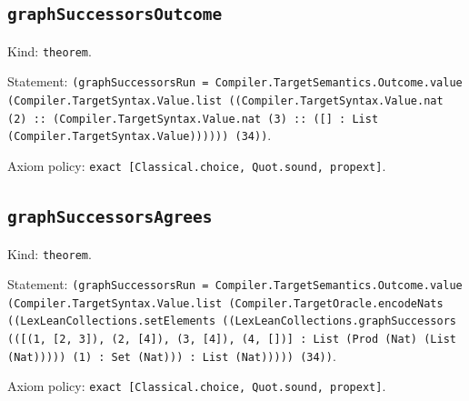 \documentclass[11pt]{article}
\begin{document}
\subsection*{\texttt{graphSuccessorsOutcome}}
\noindent Kind: \texttt{theorem}.\par
\noindent Statement: \texttt{(graphSuccessorsRun = Compiler.TargetSemantics.Outcome.value (Compiler.TargetSyntax.Value.list ((Compiler.TargetSyntax.Value.nat (2) :: (Compiler.TargetSyntax.Value.nat (3) :: ([] : List (Compiler.TargetSyntax.Value)))))) (34))}.\par
\noindent Axiom policy: \texttt{exact [Classical.choice, Quot.sound, propext]}.\par
\subsection*{\texttt{graphSuccessorsAgrees}}
\noindent Kind: \texttt{theorem}.\par
\noindent Statement: \texttt{(graphSuccessorsRun = Compiler.TargetSemantics.Outcome.value (Compiler.TargetSyntax.Value.list (Compiler.TargetOracle.encodeNats ((LexLeanCollections.setElements ((LexLeanCollections.graphSuccessors (([(1, [2, 3]), (2, [4]), (3, [4]), (4, [])] : List (Prod (Nat) (List (Nat))))) (1) : Set (Nat))) : List (Nat))))) (34))}.\par
\noindent Axiom policy: \texttt{exact [Classical.choice, Quot.sound, propext]}.\par
\end{document}
